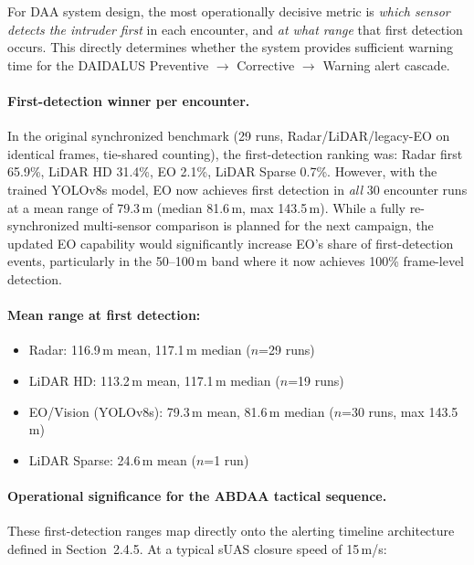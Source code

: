 For DAA system design, the most operationally decisive metric is \emph{which sensor detects the intruder first} in each encounter, and \emph{at what range} that first detection occurs. This directly determines whether the system provides sufficient warning time for the DAIDALUS Preventive $\rightarrow$ Corrective $\rightarrow$ Warning alert cascade.

\paragraph{First-detection winner per encounter.}
In the original synchronized benchmark (29 runs, Radar/LiDAR/legacy-EO on identical frames, tie-shared counting), the first-detection ranking was: Radar first 65.9\%, LiDAR HD 31.4\%, EO 2.1\%, LiDAR Sparse 0.7\%. However, with the trained YOLOv8s model, EO now achieves first detection in \emph{all} 30 encounter runs at a mean range of 79.3\,m (median 81.6\,m, max 143.5\,m). While a fully re-synchronized multi-sensor comparison is planned for the next campaign, the updated EO capability would significantly increase EO's share of first-detection events, particularly in the 50--100\,m band where it now achieves 100\% frame-level detection.

\paragraph{Mean range at first detection:}
\begin{itemize}
  \item Radar: 116.9\,m mean, 117.1\,m median ($n$=29 runs)
  \item LiDAR HD: 113.2\,m mean, 117.1\,m median ($n$=19 runs)
  \item EO/Vision (YOLOv8s): 79.3\,m mean, 81.6\,m median ($n$=30 runs, max 143.5\,m)
  \item LiDAR Sparse: 24.6\,m mean ($n$=1 run)
\end{itemize}

\paragraph{Operational significance for the ABDAA tactical sequence.}
These first-detection ranges map directly onto the alerting timeline architecture defined in Section~2.4.5. At a typical sUAS closure speed of 15\,m/s:

